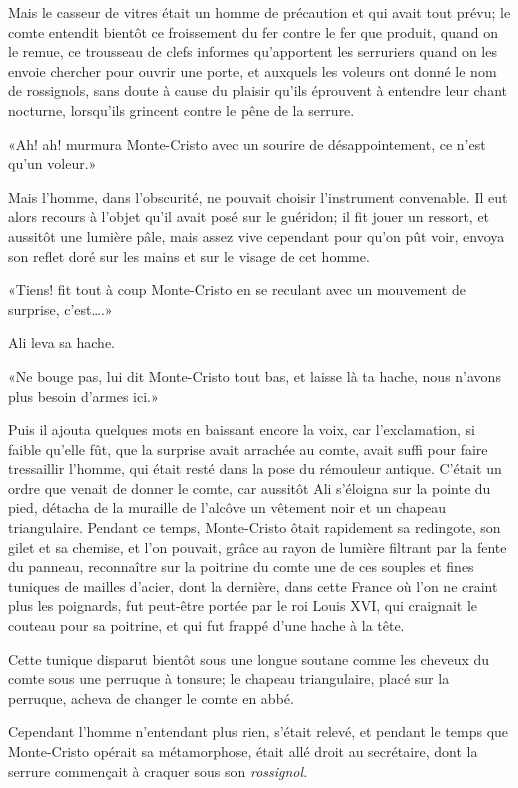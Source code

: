 Mais le casseur de vitres était un homme de précaution et qui avait tout prévu; le comte entendit bientôt ce froissement du fer contre le fer que produit, quand on le remue, ce trousseau de clefs informes qu'apportent les serruriers quand on les envoie chercher pour ouvrir une porte, et auxquels les voleurs ont donné le nom de rossignols, sans doute à cause du plaisir qu'ils éprouvent à entendre leur chant nocturne, lorsqu'ils grincent contre le pêne de la serrure. 

«Ah! ah! murmura Monte-Cristo avec un sourire de désappointement, ce n'est qu'un voleur.» 

Mais l'homme, dans l'obscurité, ne pouvait choisir l'instrument convenable. Il eut alors recours à l'objet qu'il avait posé sur le guéridon; il fit jouer un ressort, et aussitôt une lumière pâle, mais assez vive cependant pour qu'on pût voir, envoya son reflet doré sur les mains et sur le visage de cet homme. 

«Tiens! fit tout à coup Monte-Cristo en se reculant avec un mouvement de surprise, c'est\dots.» 

Ali leva sa hache. 

«Ne bouge pas, lui dit Monte-Cristo tout bas, et laisse là ta hache, nous n'avons plus besoin d'armes ici.» 

Puis il ajouta quelques mots en baissant encore la voix, car l'exclamation, si faible qu'elle fût, que la surprise avait arrachée au comte, avait suffi pour faire tressaillir l'homme, qui était resté dans la pose du rémouleur antique. C'était un ordre que venait de donner le comte, car aussitôt Ali s'éloigna sur la pointe du pied, détacha de la muraille de l'alcôve un vêtement noir et un chapeau triangulaire. Pendant ce temps, Monte-Cristo ôtait rapidement sa redingote, son gilet et sa chemise, et l'on pouvait, grâce au rayon de lumière filtrant par la fente du panneau, reconnaître sur la poitrine du comte une de ces souples et fines tuniques de mailles d'acier, dont la dernière, dans cette France où l'on ne craint plus les poignards, fut peut-être portée par le roi Louis XVI, qui craignait le couteau pour sa poitrine, et qui fut frappé d'une hache à la tête. 

Cette tunique disparut bientôt sous une longue soutane comme les cheveux du comte sous une perruque à tonsure; le chapeau triangulaire, placé sur la perruque, acheva de changer le comte en abbé. 

Cependant l'homme n'entendant plus rien, s'était relevé, et pendant le temps que Monte-Cristo opérait sa métamorphose, était allé droit au secrétaire, dont la serrure commençait à craquer sous son \textit{rossignol}. 

